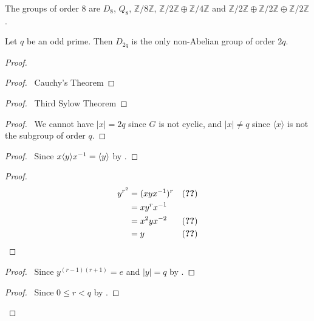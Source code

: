 \begin{cor}
The groups of order 8 are $D_8$, $Q_8$, $\mathbb{Z} / 8 \mathbb{Z}$, $\mathbb{Z} / 2 \mathbb{Z} \oplus \mathbb{Z} / 4 \mathbb{Z}$ and $\mathbb{Z} / 2 \mathbb{Z} \oplus \mathbb{Z} / 2 \mathbb{Z} \oplus \mathbb{Z} / 2 \mathbb{Z}$.
\end{cor}

\begin{prop}
Let $q$ be an odd prime. Then $D_{2q}$ is the only non-Abelian group of order $2q$.
\end{prop}

\begin{proof}
\pf
{}
\begin{proof}
	\pf\ Cauchy's Theorem
\end{proof}
\begin{proof}
	\pf\ Third Sylow Theorem
\end{proof}
\begin{proof}
	\pf\ We cannot have $|x| = 2q$ since $G$ is not cyclic, and $|x| \neq q$ since $\langle x \rangle$ is not the subgroup of order $q$.
\end{proof}
\begin{proof}
	\pf\ Since $x \langle y \rangle {x}^{-1} = \langle y \rangle$ by .
\end{proof}
\begin{proof}
	\pf
	\begin{align*}
		y^{r^2} & = (xy \inv{x})^r & (\text{\stepref{6}}) \\
		& = x y^r \inv{x} \\
		& = x^2 y x^{-2} & (\text{\stepref{6}}) \\
		& = y & (\text{\stepref{4.5}})
	\end{align*}
\end{proof}
\begin{proof}
	\pf\ Since $y^{(r-1)(r+1)} = e$ and $|y| = q$ by .
\end{proof}
\begin{proof}
	\pf\ Since $0 \leq r < q$ by .
\end{proof}

\end{proof}
